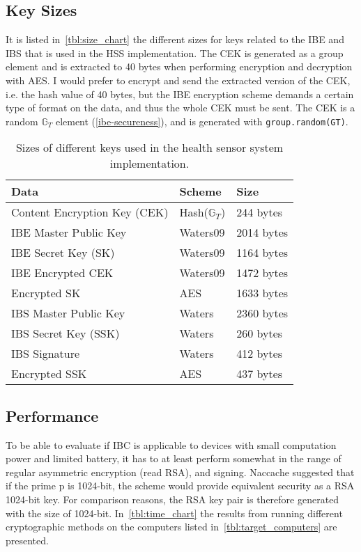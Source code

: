 \subsection{Key Sizes}
It is listed in~\autoref{tbl:size_chart} the different sizes for keys related to the \gls{IBE} and \gls{IBS} that is used in the \gls{HSS} implementation.
The \gls{CEK} is generated as a group element and is extracted to 40 bytes when performing encryption and decryption with \gls{AES}.
I would prefer to encrypt and send the extracted version of the \gls{CEK}, i.e. the hash value of 40 bytes, but the \gls{IBE} encryption scheme demands a certain type of format on the \gls{data}, and thus the whole \gls{CEK} must be sent.
The \gls{CEK} is a random $\mathbb{G}_T$ element (\autoref{ibe-secureness}), and is generated with \texttt{group.random(GT)}.
\begin{table}[h]
  \begin{tabular}[c]{p{}p{}p{}}
  Data                            & Scheme          & Size              \\ \hline
  Content Encryption Key (CEK)    & Hash($\mathbb{G}_T$) & 244 bytes         \\ %
  IBE Master Public Key           & Waters09        & 2014 bytes        \\ %
  IBE Secret Key (SK)             & Waters09        & 1164 bytes        \\ %
  IBE Encrypted CEK               & Waters09        & 1472 bytes        \\ %
  Encrypted SK                    & AES             & 1633 bytes        \\ %
  IBS Master Public Key           & Waters          & 2360 bytes        \\ %
  IBS Secret Key (SSK)            & Waters          & 260 bytes         \\ %
  IBS Signature                   & Waters          & 412 bytes         \\ %
  Encrypted SSK                   & AES             & 437 bytes         \\ %
  \end{tabular}
  \caption{Sizes of different keys used in the health sensor system implementation.}
  \label{tbl:size_chart}
\end{table}


\subsection{Performance}\label{ibc-performance}
To be able to evaluate if \gls{IBC} is applicable to devices with small computation power and limited battery, it has to at least perform somewhat in the range of regular asymmetric encryption (read RSA), and signing. 
Naccache suggested that if the prime \gls{p} is 1024-bit, the scheme would provide equivalent security as a RSA 1024-bit key.
For comparison reasons, the RSA key pair is therefore generated with the size of 1024-bit.
In~\autoref{tbl:time_chart} the results from running different cryptographic methods on the computers listed in~\autoref{tbl:target_computers} are presented.

